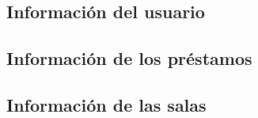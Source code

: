 \subsection{Información del usuario}

\subsection{Información de los préstamos}

\subsection{Información de las salas}
